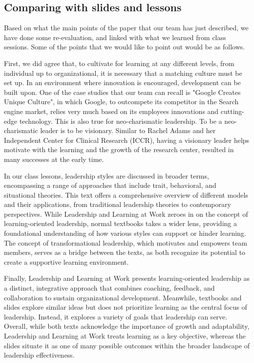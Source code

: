 \subsection{Comparing with slides and lessons}
Based on what the main points of the paper that our team has just described, we have done some
re-evaluation, and linked with what we learned from class sessions. Some of the points that we would
like to point out would be as follows.

First, we did agree that, to cultivate for learning at any different levels, from individual up to
organizational, it is necessary that a matching culture must be set up. In an environment where
innovation is encouraged, development can be built upon. One of the case studies that our team can
recall is "Google Creates Unique Culture", in which Google, to outcompete its competitor in the
Search engine market, relies very much based on its employees innovations and cutting-edge
technology. This is also true for neo-charismatic leadership. To be a neo-charismatic leader is to
be visionary. Similar to Rachel Adams and her Independent Center for Clinical Research (ICCR),
having a visionary leader helps motivate with the learning and the growth of the research center,
resulted in many successes at the early time.

In our class lessons, leadership styles are discussed in broader terms, encompassing a range of
approaches that include trait, behavioral, and situational theories. This text offers a
comprehensive overview of different models and their applications, from traditional leadership
theories to contemporary perspectives. While Leadership and Learning at Work zeroes in on the
concept of learning-oriented leadership, normal textbooks takes a wider lens, providing a
foundational understanding of how various styles can support or hinder learning. The concept of
transformational leadership, which motivates and empowers team members, serves as a bridge between
the texts, as both recognize its potential to create a supportive learning environment.

Finally, Leadership and Learning at Work presents learning-oriented leadership as a distinct,
integrative approach that combines coaching, feedback, and collaboration to sustain organizational
development. Meanwhile, textbooks and slides explore similar ideas but does not prioritize learning
as the central focus of leadership. Instead, it explores a variety of goals that leadership can
serve. Overall, while both texts acknowledge the importance of growth and adaptability, Leadership
and Learning at Work treats learning as a key objective, whereas the slides situate it as one of
many possible outcomes within the broader landscape of leadership effectiveness.

